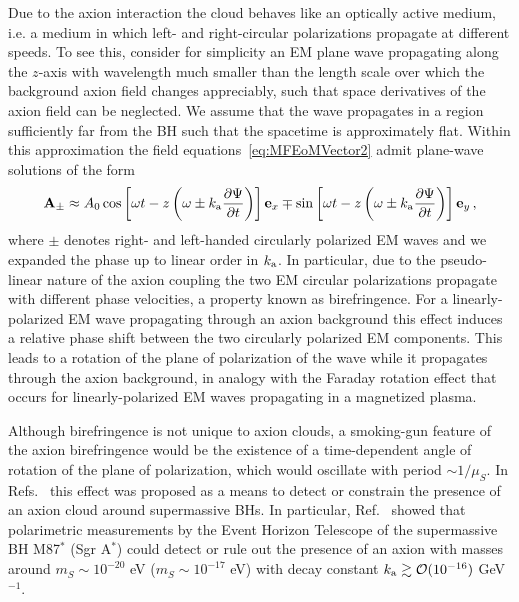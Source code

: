 \documentclass[11pt]{article}
\numberwithin{equation}{section} %
\begin{document}
Due to the axion interaction the cloud behaves like an optically active medium, i.e. a medium in which left- and right-circular polarizations propagate at different speeds. To see this, consider for simplicity an EM plane wave propagating along the $z$-axis with wavelength much smaller than the length scale over which the background axion field changes appreciably, such that space derivatives of the axion field can be neglected. We assume that the wave propagates in a region sufficiently far from the BH such that the spacetime is approximately flat. Within this approximation the field equations~\eqref{eq:MFEoMVector2} admit plane-wave solutions of the form~\cite{Harari:1992ea}
%
\begin{equation}
\mathbf{A}_{\pm} \approx A_{0} \cos\left[\omega t-z\left(\omega \pm k_{\rm a}\frac{\partial \Psi}{\partial t}\right)\right] \mathbf{e}_x \mp \sin\left[\omega t-z\left(\omega \pm k_{\rm a}\frac{\partial \Psi}{\partial t}\right)\right]\mathbf{e}_y\,,
\end{equation}
%
where $\pm$ denotes right- and left-handed circularly polarized EM waves and we expanded the phase up to linear order in $k_{\rm a}$. In particular, due to the pseudo-linear nature of the axion coupling the two EM circular polarizations propagate with different phase velocities, a property known as birefringence. For a linearly-polarized EM wave propagating through an axion background this effect induces a relative phase shift between the two circularly polarized EM components. This leads to a rotation of the plane of polarization of the wave while it propagates through the axion background, in analogy with the Faraday rotation effect that occurs for linearly-polarized EM waves propagating in a magnetized plasma. 

Although birefringence is not unique to axion clouds, a smoking-gun feature of the axion birefringence would be the existence of a time-dependent angle of rotation of the plane of polarization, which would oscillate with period $\sim 1/\mu_S$. In Refs.~\cite{Plascencia:2017kca,Chen:2019fsq} this effect was proposed as a means to detect or constrain the presence of an axion cloud around supermassive BHs. In particular, Ref.~\cite{Chen:2019fsq} showed that polarimetric measurements by the Event Horizon Telescope of the supermassive BH M87$^*$ (Sgr A$^*$) could detect or rule out the presence of an axion with masses around $m_S\sim 10^{-20}$ eV ($m_S\sim 10^{-17}$ eV) with decay constant $k_{\rm a} \gtrsim \mathcal{O}(10^{-16})$ GeV$^{-1}$.
\end{document}
